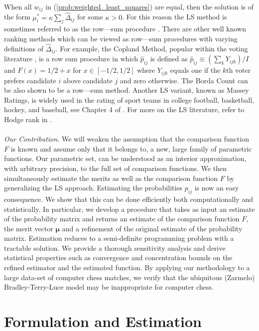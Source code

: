 \documentclass[twoside,11pt]{article}
\begin{document}
When all $w_{ij}$ in (\ref{prob:weighted_least_squares}) are equal, then the solution is of the form $\mu_i^* = \kappa\sum_{j}\hat{\Delta}_{ij}$ for some $\kappa>0$. For this reason the LS method is sometimes referred to as the row---sum procedure \citep{huber}. There are other well known ranking methods which can be viewed as row---sum procedures with varying definitions of  $\hat{\Delta}_{ij}$. For example, the Copland Method, popular within the voting literature \citep{levin, favardin}, is a row sum procedure in which $\hat{p}_{ij}$ is defined as $\hat{p}_{ij}\equiv (\sum_{k}Y_{ijk})/I$ and $F(x) = 1/2+x$ for  $x\in [-1/2,1/2]$ where $Y_{ijk}$ equals one if the $k$th voter prefers  candidate $i$ above candidate $j$ and zero otherwise. The Borda Count can be also shown to be a row---sum method. Another LS variant, known as Massey Ratings, is widely used in the rating of sport teams in college football, basketball, hockey, and baseball, see Chapter 4 of \citet{massey}.  For more on the LS literature, refer to Hodge rank in \citet{jiang}.\\
\\
\textit{Our Contribution.}
We will weaken the assumption that the comparison function $F$ is known and assume only that it belongs to, a new, large family of parametric functions. Our parametric set,  can be understood as an interior approximation, with arbitrary precision, to the full set of comparison functions. We then simultaneously estimate the merits as well as the comparison function $F$ by generalizing the LS approach. Estimating the probabilities $p_{ij}$ is now an easy consequence. We show that this can be done efficiently both computationally and statistically. In particular, we develop a procedure that takes as input an estimate of the probability matrix and returns an estimate of the comparison function $F$, the merit vector $\boldsymbol{\mu}$ and a refinement of the original estimate of the probability matrix.  Estimation reduces to a semi-definite programming problem with a tractable solution. We provide a thorough sensitivity analysis and derive statistical properties such as convergence and concentration bounds on the refined estimator and the estimated function. By applying our methodology to a large data-set of computer chess matches, we verify that the ubiquitous (Zarmelo) Bradley-Terry-Luce model may be inappropriate for computer chess. 


\section{Formulation and Estimation}
\label{sec:prob_formulation}
\end{document}
